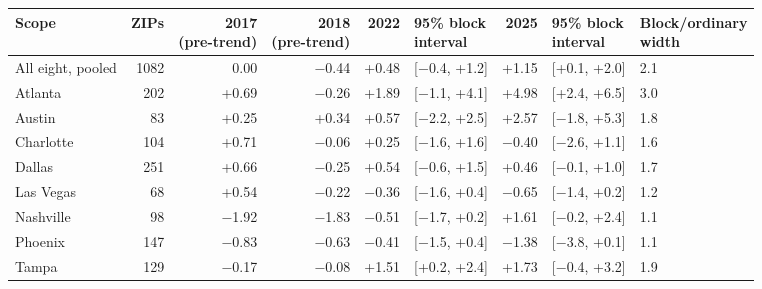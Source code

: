 \footnotesize\setlength{\tabcolsep}{4pt}
\begin{tabular}{lrrrrlrll}
\toprule
Scope & ZIPs & \shortstack[r]{2017\\(pre-trend)} & \shortstack[r]{2018\\(pre-trend)} & 2022 & \shortstack[r]{95\% block\\interval} & 2025 & \shortstack[r]{95\% block\\interval} & \shortstack[r]{Block/ordinary\\width} \\
\midrule
All eight, pooled & 1082 & 0.00 & $-$0.44 & +0.48 & [$-$0.4, +1.2] & +1.15 & [+0.1, +2.0] & 2.1 \\
Atlanta & 202 & +0.69 & $-$0.26 & +1.89 & [$-$1.1, +4.1] & +4.98 & [+2.4, +6.5] & 3.0 \\
Austin & 83 & +0.25 & +0.34 & +0.57 & [$-$2.2, +2.5] & +2.57 & [$-$1.8, +5.3] & 1.8 \\
Charlotte & 104 & +0.71 & $-$0.06 & +0.25 & [$-$1.6, +1.6] & $-$0.40 & [$-$2.6, +1.1] & 1.6 \\
Dallas & 251 & +0.66 & $-$0.25 & +0.54 & [$-$0.6, +1.5] & +0.46 & [$-$0.1, +1.0] & 1.7 \\
Las Vegas & 68 & +0.54 & $-$0.22 & $-$0.36 & [$-$1.6, +0.4] & $-$0.65 & [$-$1.4, +0.2] & 1.2 \\
Nashville & 98 & $-$1.92 & $-$1.83 & $-$0.51 & [$-$1.7, +0.2] & +1.61 & [$-$0.2, +2.4] & 1.1 \\
Phoenix & 147 & $-$0.83 & $-$0.63 & $-$0.41 & [$-$1.5, +0.4] & $-$1.38 & [$-$3.8, +0.1] & 1.1 \\
Tampa & 129 & $-$0.17 & $-$0.08 & +1.51 & [+0.2, +2.4] & +1.73 & [$-$0.4, +3.2] & 1.9 \\
\bottomrule
\end{tabular}
